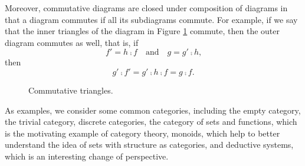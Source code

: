 \begin{remark}
  \label{re:commutative-diagram}


  Moreover, commutative diagrams are closed under composition of
  diagrams in that a diagram commutes if all its subdiagrams commute.
  For example, if we say that the inner triangles of the diagram in
  Figure \ref{fig:commutative-triangles} commute, then the outer
  diagram commutes as well, that is, if
  \begin{equation*}
    f' = h \comp f
    \quad
    \text{and}
    \quad
    g = g' \comp h
    \text{,}
  \end{equation*}
  then
  \begin{equation*}
    g' \comp f' = g' \comp h \comp f = g \comp f
    \text{.}
  \end{equation*}

  \begin{figure}[htb]
    \begin{center}
    \end{center}
    \caption{Commutative triangles.}
    \label{fig:commutative-triangles}
  \end{figure}

\end{remark}

As examples, we consider some common categories, including the empty
category, the trivial category, discrete categories, the category of
sets and functions, which is the motivating example of category
theory, monoids, which help to better understand the idea of sets with
structure as categories, and deductive systems, which is an
interesting change of perspective.

